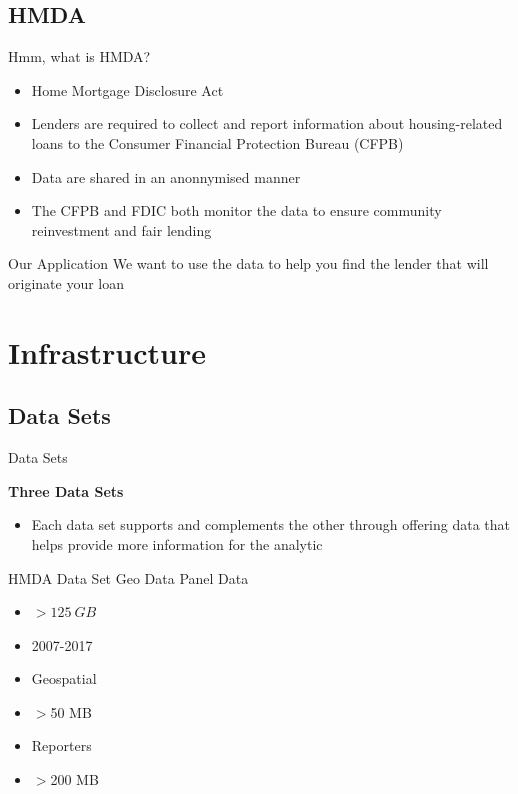 \documentclass{beamer}
\begin{document}
\subsection{HMDA}

\begin{frame}{Hmm, what is HMDA?}

\begin{itemize}
    \item Home Mortgage Disclosure Act
    \item Lenders are required to collect and report information about housing-related loans to the Consumer Financial Protection Bureau (CFPB)
    \item Data are shared in an anonnymised manner
    \item The CFPB and FDIC both monitor the data to ensure community reinvestment and fair lending
\end{itemize}

\begin{block}{Our Application}
We want to use the data to help you find the lender that will originate your loan
\end{block}


\end{frame}


\section{Infrastructure}
\subsection{Data Sets}
\begin{frame}{Data Sets}

\textbf{Three Data Sets}
\begin{itemize}
    \item Each data set supports and complements the other through offering data that helps provide more information for the analytic
\end{itemize}
\vspace{5mm}
HMDA Data Set \hspace{12mm}  Geo Data \hspace{18mm}  Panel Data
    \begin{multicols}{3}
    \begin{itemize}
        \item $> 125 \ GB$
        \item 2007-2017
        \item Geospatial
        \item $>$50 MB
        \item Reporters
        \item $>$200 MB
    \end{itemize}
    \end{multicols}
\end{frame}
\end{document}

